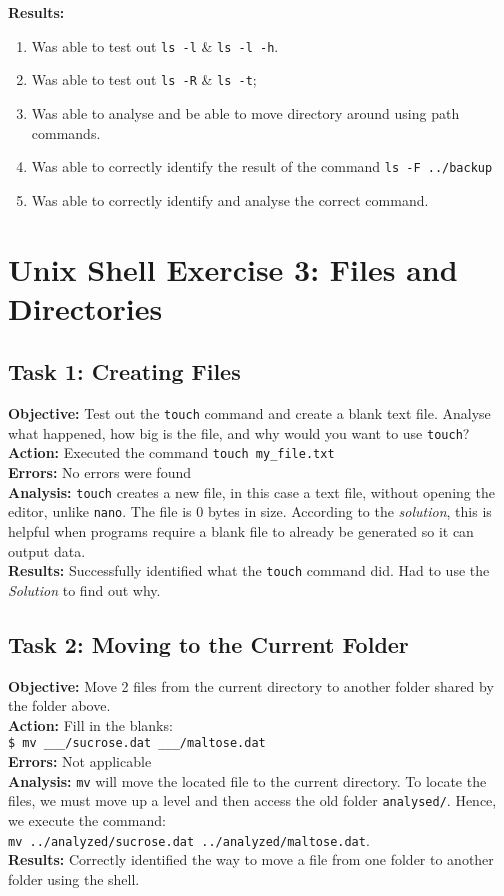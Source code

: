 \documentclass{article}
\begin{document}
\textbf{Results:}
\begin{enumerate}
    \item Was able to test out \verb|ls -l| \& \verb|ls -l -h|.
    \item Was able to test out \verb|ls -R| \& \verb|ls -t|;
    \item Was able to analyse and be able to move directory around using path commands.
    \item Was able to correctly identify the result of the command \verb|ls -F ../backup|
    \item Was able to correctly identify and analyse the correct command.
\end{enumerate}
\newpage
\section{Unix Shell Exercise 3: Files and Directories}
%
\subsection{Task 1: Creating Files}
%
\textbf{Objective:} Test out the \verb|touch| command and create a blank text file. Analyse what happened, how big is the file, and why would you want to use \verb|touch|?
\textbf{Action:}
Executed the command \verb|touch my_file.txt|\\
\textbf{Errors:} No errors were found\\
\textbf{Analysis:} \verb|touch| creates a new file, in this case a text file, without opening the editor, unlike \verb|nano|. The file is 0 bytes in size. According to the \textit{solution}, this is helpful when programs require a blank file to already be generated so it can output data.\\
\textbf{Results:} Successfully identified what the \verb|touch| command did. Had to use the \textit{Solution} to find out why.
%
\subsection{Task 2: Moving to the Current Folder}
%
\textbf{Objective:} Move 2 files from the current directory to another folder shared by the folder above.\\
\textbf{Action:} Fill in the blanks:\\\verb|$ mv ___/sucrose.dat ___/maltose.dat|\\
\textbf{Errors:} Not applicable\\
\textbf{Analysis:} \verb|mv| will move the located file to the current directory. To locate the files, we must move up a level and then access the old folder \verb|analysed/|. Hence, we execute the command:\\
\verb|mv ../analyzed/sucrose.dat ../analyzed/maltose.dat|.\\
\textbf{Results:} Correctly identified the way to move a file from one folder to another folder using the shell.
%
\end{document}
